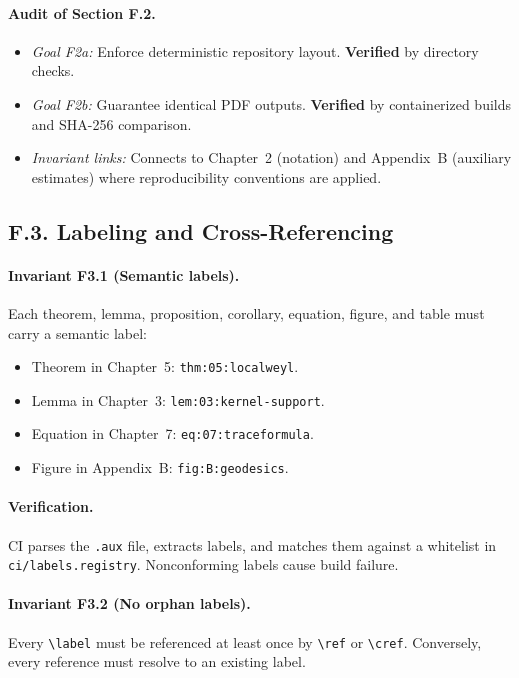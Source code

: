 \paragraph{Audit of Section F.2.}
\begin{itemize}
  \item \emph{Goal F2a:} Enforce deterministic repository layout.
        \textbf{Verified} by directory checks.
  \item \emph{Goal F2b:} Guarantee identical PDF outputs.
        \textbf{Verified} by containerized builds and SHA-256 comparison.
  \item \emph{Invariant links:} Connects to Chapter~2 (notation) and
        Appendix~B (auxiliary estimates) where reproducibility
        conventions are applied.
\end{itemize}

\subsection*{F.3. Labeling and Cross-Referencing}

\paragraph{Invariant F3.1 (Semantic labels).}
Each theorem, lemma, proposition, corollary, equation, figure, and
table must carry a semantic label:
\begin{itemize}
  \item Theorem in Chapter~5: \texttt{thm:05:localweyl}.
  \item Lemma in Chapter~3: \texttt{lem:03:kernel-support}.
  \item Equation in Chapter~7: \texttt{eq:07:traceformula}.
  \item Figure in Appendix~B: \texttt{fig:B:geodesics}.
\end{itemize}

\paragraph{Verification.}
CI parses the \texttt{.aux} file, extracts labels, and matches them
against a whitelist in \texttt{ci/labels.registry}. Nonconforming labels
cause build failure.

\paragraph{Invariant F3.2 (No orphan labels).}
Every \texttt{\textbackslash label} must be referenced at least once by
\texttt{\textbackslash ref} or \texttt{\textbackslash cref}.
Conversely, every reference must resolve to an existing label.

